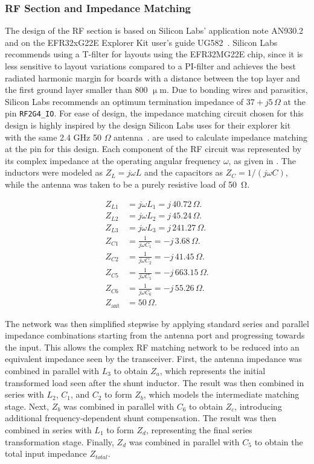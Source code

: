 \subsubsection{RF Section and Impedance Matching}
The design of the RF section is based on Silicon Labs' application note AN930.2~\cite{Matching_guide} and on the EFR32xG22E Explorer Kit user's guide UG582~\cite{User_guide}. Silicon Labs recommends using a T-filter for layouts using the EFR32MG22E chip, since it is less sensitive to layout variations compared to a PI-filter and achieves the best radiated harmonic margin for boards with a distance between the top layer and the first ground layer smaller than 800 $\upmu$m. Due to bonding wires and parasitics, Silicon Labs recommends an optimum termination impedance of $37 + j5\, \Omega$ at the pin \texttt{RF2G4\_IO}. For ease of design, the impedance matching circuit chosen for this design is highly inspired by the design Silicon Labs uses for their explorer kit with the same 2.4 GHz 50 $\Omega$ antenna~\cite{Antenna}.  are used to calculate impedance matching at the pin for this design. 
Each component of the RF circuit was represented by its complex impedance at the operating angular frequency $\omega$, as given in . The inductors were modeled as $Z_L = j\omega L$ and the capacitors as $Z_C = 1/(j\omega C)$, while the antenna was taken to be a purely resistive load of \SI{50}{\ohm}.

\begin{align}
Z_{L1} &= j\omega L_1 = j\,40.72\,\Omega \label{eq:ZL1}.\\
Z_{L2} &= j\omega L_2 = j\,45.24\,\Omega \label{eq:ZL2}.\\
Z_{L3} &= j\omega L_3 = j\,241.27\,\Omega \label{eq:ZL3}.\\
Z_{C1} &= \frac{1}{j\omega C_1} = -j\,3.68\,\Omega \label{eq:ZC1}.\\
Z_{C2} &= \frac{1}{j\omega C_2} = -j\,41.45\,\Omega \label{eq:ZC2}.\\
Z_{C5} &= \frac{1}{j\omega C_5} = -j\,663.15\,\Omega \label{eq:ZC5}.\\
Z_{C6} &= \frac{1}{j\omega C_6} = -j\,55.26\,\Omega \label{eq:ZC6}.\\
Z_{\text{ant}} &= 50\,\Omega \label{eq:Zant}.
\end{align}

The network was then simplified stepwise by applying standard series and parallel impedance combinations starting from the antenna port and progressing towards the input. This allows the complex RF matching network to be reduced into an equivalent impedance seen by the transceiver.
First, the antenna impedance was combined in parallel with $L_3$ to obtain $Z_a$, which represents the initial transformed load seen after the shunt inductor. The result was then combined in series with $L_2$, $C_1$, and $C_2$ to form $Z_b$, which models the intermediate matching stage. Next, $Z_b$ was combined in parallel with $C_6$ to obtain $Z_c$, introducing additional frequency-dependent shunt compensation. The result was then combined in series with $L_1$ to form $Z_d$, representing the final series transformation stage. Finally, $Z_d$ was combined in parallel with $C_5$ to obtain the total input impedance $Z_{total}$.

